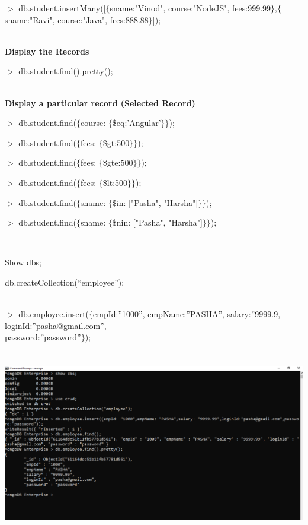 \documentclass{article}
\begin{document}
\noindent  $\mathrm{>}$ db.student.insertMany([$\mathrm{\{}$sname:"Vinod", course:"NodeJS", fees:999.99$\mathrm{\}}$,$\mathrm{\{}$sname:"Ravi", course:"Java", fees:888.88$\mathrm{\}}$]);

\noindent \\ \textbf{Display the Records}

\noindent $\mathrm{>}$ db.student.find().pretty();

\noindent 

\noindent \\ \textbf{Display a particular record (Selected Record)}

\noindent $\mathrm{>}$ db.student.find($\mathrm{\{}$course: $\mathrm{\{}$\$eq:'Angular'$\mathrm{\}}$$\mathrm{\}}$);             

\noindent $\mathrm{>}$ db.student.find($\mathrm{\{}$fees: $\mathrm{\{}$\$gt:500$\mathrm{\}}$$\mathrm{\}}$);                      

\noindent $\mathrm{>}$ db.student.find($\mathrm{\{}$fees: $\mathrm{\{}$\$gte:500$\mathrm{\}}$$\mathrm{\}}$);                     

\noindent $\mathrm{>}$ db.student.find($\mathrm{\{}$fees: $\mathrm{\{}$\$lt:500$\mathrm{\}}$$\mathrm{\}}$);                     

\noindent $\mathrm{>}$ db.student.find($\mathrm{\{}$sname: $\mathrm{\{}$\$in: ["Pasha", "Harsha"]$\mathrm{\}}$$\mathrm{\}}$);  

\noindent $\mathrm{>}$ db.student.find($\mathrm{\{}$sname: $\mathrm{\{}$\$nin: ["Pasha", "Harsha"]$\mathrm{\}}$$\mathrm{\}}$);

\noindent 

\noindent 
\newpage
\noindent \\ \textbf{}

\noindent Show dbs;

\noindent db.createCollection(``employee'');

\noindent \\ $\mathrm{>}$ db.employee.insert($\mathrm{\{}$empId:''1000'', empName:''PASHA'', salary:''9999.9, loginId:''pasha@gmail.com'', \\ password:''password''$\mathrm{\}}$);   

\noindent 

\noindent \begin{center}
	\includegraphics*[width=6.24in, height=3.22in]{IMG-04-07}

\end{center}
\end{document}
